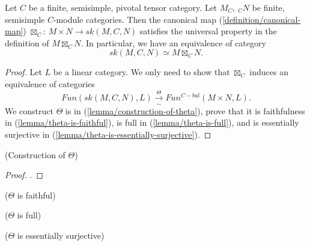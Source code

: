 \begin{theorem} \label{theorem/main-theorem}

  \noindent Let $C$ be a finite, semisimple, pivotal tensor category. Let
  $M_{C}, \, {}_{C}N$ be finite, semisimple $C$-module categories. Then the
  canonical map (\ref{definition/canonical-map}) $\boxtimes_{C}$:
  $M \times N \to sk(M,C,N)$ satisfies the universal property in the
  definition of $M \boxtimes_{C} N$. In particular, we have an equivalence of
  category
  \[
    sk(M,C,N) \simeq M \boxtimes_{C} N.
  \]
\end{theorem}

\begin{proof}
  Let $L$ be a linear category. We only need to show that $\boxtimes_{C}$
  induces an equivalence of categories
  \[
    Fun(sk(M,C,N), L) \xrightarrow[\sim]{\Theta} Fun^{C-bal}(M \times N, L).
  \]
  We construct $\Theta$ is in (\ref{lemma/construction-of-theta}), prove that
  it is faithfulness in (\ref{lemma/theta-is-faithful}), is full in (\ref{lemma/theta-is-full}), and is essentially
  surjective in (\ref{lemma/theta-is-essentially-surjective}).
\end{proof}

\begin{lemma}\label{lemma/construction-of-theta} (Construction of $\Theta$)
\end{lemma}

\begin{proof}
  .
\end{proof}

\begin{lemma}\label{lemma/theta-is-faithful} ($\Theta$ is faithful)
\end{lemma}

\begin{lemma}\label{lemma/theta-is-full} ($\Theta$ is full)
\end{lemma}

\begin{lemma}\label{lemma/theta-is-essentially-surjective} ($\Theta$ is essentially surjective)
\end{lemma}
